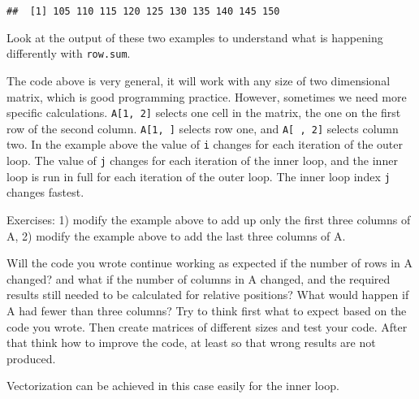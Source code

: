 \documentclass[paper=a4,headsepline,BCOR=12mm,twoside,open=right,%
titlepage,headings=small,fontsize=10pt,index=totoc,bibliography=totoc,%
captions=tableheading,captions=nooneline]{scrbook}\usepackage{knitr}
\begin{document}
\begin{knitrout}\footnotesize
{}\color{fgcolor}\begin{kframe}
\begin{alltt}
 \hlkwb{<-} \hlstd{(} 
   \hlopt{:}
   \hlkwb{<-} 
     \hlopt{:}
     \hlkwb{<-}  \hlopt{+} 
\hlstd{\}}
\end{alltt}
\begin{verbatim}
##  [1] 105 110 115 120 125 130 135 140 145 150
\end{verbatim}
\end{kframe}
\end{knitrout}

Look at the output of these two examples to understand what is happening differently with \texttt{row.sum}.

The code above is very general, it will work with any size of two dimensional matrix, which is good programming practice. However, sometimes we need more specific calculations. \texttt{A[1, 2]} selects one cell in the matrix, the one on the first row of the second column. \texttt{A[1, ]} selects row one, and  \texttt{A[ , 2]} selects column two. In the example above the value of \texttt{i} changes for each iteration of the outer loop. The value of \texttt{j} changes for each iteration of the inner loop, and the inner loop is run in full for each iteration of the outer loop. The inner loop index \texttt{j} changes fastest.

Exercises: 1) modify the example above to add up only the first three columns of A, 2) modify the example above to add the last three columns of A.

Will the code you wrote continue working as expected if the number of rows in A changed? and what if the number of columns in A changed, and the required results still needed to be calculated for relative positions? What would happen if A had fewer than three columns? Try to think first what to expect based on the code you wrote. Then create matrices of different sizes and test your code. After that think how to improve the code, at least so that wrong results are not produced.

Vectorization can be achieved in this case easily for the inner loop.
\end{document}
